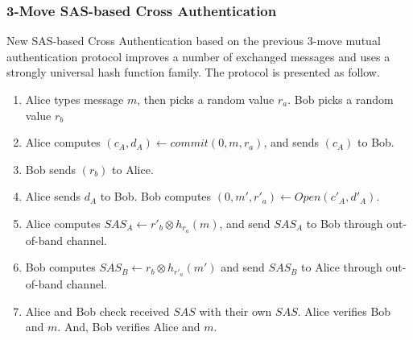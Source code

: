 \subsubsection*{3-Move SAS-based Cross Authentication}

New SAS-based Cross Authentication based on the previous 3-move mutual authentication protocol improves a number of exchanged messages and uses a strongly universal hash function family. The protocol is presented as follow. 
 
\begin{enumerate}
\item Alice types message $m$, then picks a random value $r_a$. Bob  picks a random value $r_b$
\item Alice computes $(c_A,d_A) \leftarrow commit(0,m,r_a)$, and sends $(c_A)$ to Bob.
\item Bob sends $(r_b)$ to Alice.
\item Alice sends $d_A$ to Bob. Bob computes $(0,m',r'_a) \leftarrow Open(c'_A,d'_A)$. 
\item Alice computes $SAS_A \leftarrow r'_b \otimes h_{r_a}(m)$, and send $SAS_A$ to Bob through out-of-band channel. 
\item Bob computes $SAS_B \leftarrow r_b \otimes h_{r'_a}(m')$ and send $SAS_B$ to Alice through out-of-band channel. 
\item Alice and Bob check received $SAS$ with their own $SAS$. Alice verifies Bob and $m$. And, Bob verifies Alice and $m$.
\end{enumerate}

